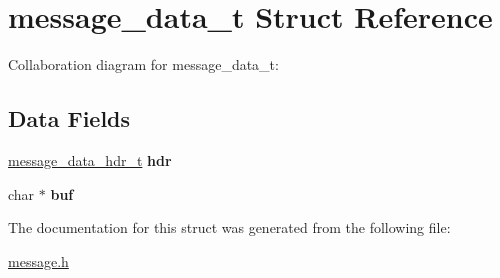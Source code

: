 \hypertarget{structmessage__data__t}{}\section{message\+\_\+data\+\_\+t Struct Reference}
\label{structmessage__data__t}


Collaboration diagram for message\+\_\+data\+\_\+t\+:
\subsection*{Data Fields}
\begin{DoxyCompactItemize}
\item 
\mbox{\label{structmessage__data__t_ad76687ebed3a13ddae03410b64f3b134}} 
\hyperlink{structmessage__data__hdr__t}{message\+\_\+data\+\_\+hdr\+\_\+t} {\bfseries hdr}
\item 
\mbox{\label{structmessage__data__t_a1fe855c208bc17a51a4d34fefdb2d5b1}} 
char $\ast$ {\bfseries buf}
\end{DoxyCompactItemize}


The documentation for this struct was generated from the following file\+:\begin{DoxyCompactItemize}
\item 
\hyperlink{message_8h}{message.\+h}\end{DoxyCompactItemize}
